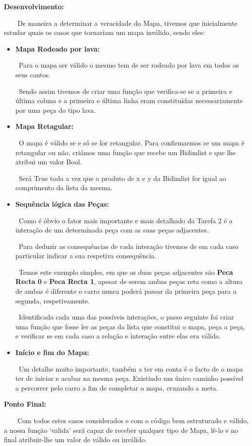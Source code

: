 \documentclass[a4paper]{report} %
\begin{document}
           \par \textbf{ Desenvolvimento:} 
           \par \ \ \ \ De maneira a determinar a veracidade do Mapa, tivemos que inicialmente estudar quais os casos que tornariam um mapa inválido, sendo eles:
             \begin{itemize}
                \item \textbf{Mapa Rodeado por lava:}
                \par \ Para o mapa ser válido o mesmo tem de ser rodeado por lava em todos os seus cantos. 
                \par \ Sendo assim tivemos de criar uma função que verifica-se se a primeira e última coluna e a primeira e última linha eram constituídas necessariamente por uma peça do tipo lava.
                \item \textbf{Mapa Retagular:}
                \par \ O mapa é válido se e só se for retangular. Para confirmarmos se um mapa é retangular ou não, criámos uma função que recebe um Bidimlist e que lhe atribui um valor Bool. 
                \par \ Será True toda a vez que o produto de x e y da Bidimlist for igual ao comprimento da lista da mesma.
                \item \textbf{Sequência lógica das Peças:}
                \par \ Como é óbvio o fator mais importante e mais detalhado da Tarefa 2 é a interação de um determinada peça com as suas peças adjacentes. 
                \par \ Para deduzir as consequências de cada interação tivemos de em cada caso particular indicar a sua respetiva consequência. 
                \par \ Temos este exemplo simples, em que as duas peças adjacentes são \textbf{Peca Recta 0} e \textbf{Peca Recta 1}, apesar de serem ambas peças reta como a altura de ambas é diferente o carro nunca poderá passar da primeira peça para a segunda, respetivamente. 
                \par \ Identificada cada uma das possíveis interações, o passo seguinte foi criar uma função que fosse ler as peças da lista que constitui o mapa, peça a peça, e verificar se em cada caso a relação e interação entre elas era válida.
                \item \textbf{Início e fim do Mapa:}
                \par \ Um detalhe muito importante, também a ter em conta é o facto de o mapa ter de iniciar e acabar na mesma peça. Existindo um único caminho possível a percorrer pelo carro a fim de completar o mapa, cruzando a meta.
                \end{itemize}
            \par \textbf{ Ponto Final:} 
            \par \ \ \ \  Com todos estes casos considerados e com o código bem estruturado e válido, a nossa função ‘valida’ será capaz de receber qualquer tipo de Mapa, lê-lo e no final atribuir-lhe um valor de válido ou inválido.    
           \vspace{6mm}
           
\end{document}
